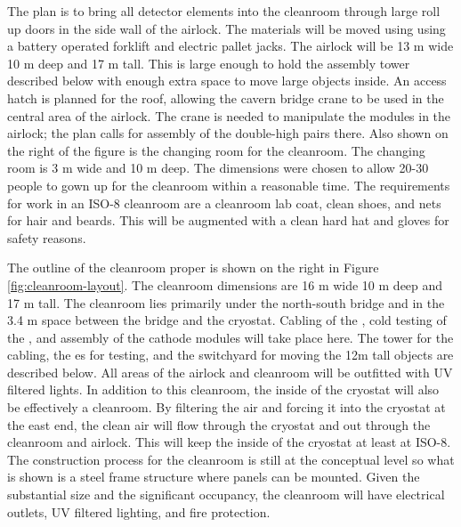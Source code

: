 The plan is to bring all detector elements into the cleanroom through large roll up doors in the side wall of the airlock. The materials will be moved using using  a battery operated forklift and electric pallet jacks. The airlock will be  13 \si{m} wide 10 \si{m} deep and 17 \si{m} tall. This is large enough to hold the  assembly tower described below with enough extra space to move large objects inside. An access hatch is planned for the roof, allowing the cavern bridge crane to be used in the central area of the airlock. The crane is needed to manipulate the  modules in the airlock; the plan calls for assembly of the double-high  pairs there. Also shown on the right of the figure is the changing room for the cleanroom. The changing room is 3 \si{m} wide and 10 \si{m} deep. The dimensions were chosen to allow 20-30 people to gown up for the cleanroom within a reasonable time. The requirements for work in an ISO-8 cleanroom are a cleanroom lab coat, clean shoes, and nets for hair and beards.  This will be augmented with a clean hard hat and gloves for safety reasons. 

The outline of the cleanroom proper is shown on the right in Figure \ref{fig:cleanroom-layout}. The cleanroom dimensions are 16 \si{m} wide 10 \si{m} deep and 17 \si{m} tall. The cleanroom lies primarily under the north-south bridge and in the 3.4 m space between the bridge and the cryostat. %
Cabling of the , cold testing of the , and assembly of the cathode  modules will take place here. The tower for the  cabling, the \coldbox{}es for testing, and the switchyard for moving the 12m tall objects are described below. All areas of the airlock and cleanroom will be outfitted with UV filtered lights. In addition to this cleanroom, the inside of the cryostat will also be effectively a cleanroom.  By filtering the air and forcing it  into the cryostat at the east end, the clean air will flow through the cryostat and out through the cleanroom and airlock. This will keep the inside of the cryostat at least at ISO-8. The construction process for the cleanroom is still at the conceptual level so what is shown is a steel frame structure where panels can be mounted. %
Given the substantial size and the significant occupancy, the cleanroom will have electrical outlets, UV filtered lighting, and fire protection. 

